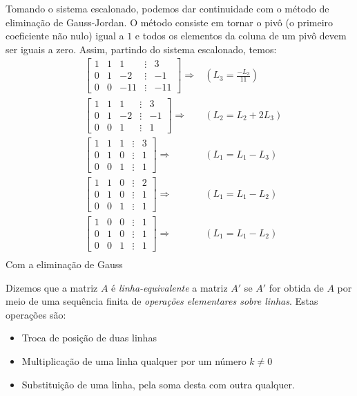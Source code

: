 \begin{exemplo}
Tomando o sistema escalonado, podemos dar continuidade com o método de eliminação de Gauss-Jordan. O método consiste em tornar o pivô (o primeiro coeficiente não nulo) igual a $1$ e todos os elementos da coluna de um pivô devem ser iguais a zero. Assim, partindo do sistema escalonado, temos:
\begin{align*}
&\begin{bmatrix}
1 & 1 & 1 & \vdots & 3 \\
0 & 1 & -2 & \vdots & -1 \\
0 & 0 & -11 & \vdots & -11
\end{bmatrix}\Rightarrow &(L_3 =\frac{-L_3}{11}) \\
&\begin{bmatrix}
1 & 1 & 1 & \vdots & 3 \\
0 & 1 & -2 & \vdots & -1 \\
0 & 0 & 1 & \vdots & 1
\end{bmatrix}\Rightarrow &(L_2 =L_2+2L_3) \\
&\begin{bmatrix}
1 & 1 & 1 & \vdots & 3 \\
0 & 1 & 0 & \vdots & 1 \\
0 & 0 & 1 & \vdots & 1
\end{bmatrix}\Rightarrow &(L_1 =L_1-L_3) \\
&\begin{bmatrix}
1 & 1 & 0 & \vdots & 2 \\
0 & 1 & 0 & \vdots & 1 \\
0 & 0 & 1 & \vdots & 1
\end{bmatrix}\Rightarrow &(L_1 =L_1-L_2) \\
&\begin{bmatrix}
1 & 0 & 0 & \vdots & 1 \\
0 & 1 & 0 & \vdots & 1 \\
0 & 0 & 1 & \vdots & 1
\end{bmatrix}\Rightarrow &(L_1 =L_1-L_2) \\
\end{align*}
Com a eliminação de Gauss %
\end{exemplo}

\begin{df}
Dizemos que a matriz $A$ é \emph{linha-equivalente} a matriz $A'$ se $A'$ for obtida de $A$ por meio de uma sequência finita de \emph{operações elementares sobre linhas}. Estas operações são:
\begin{itemize}
\item Troca de posição de duas linhas
\item Multiplicação de uma linha qualquer por um número $k\neq0$
\item Substituição de uma linha, pela soma desta com outra qualquer.
\end{itemize}
\end{df}